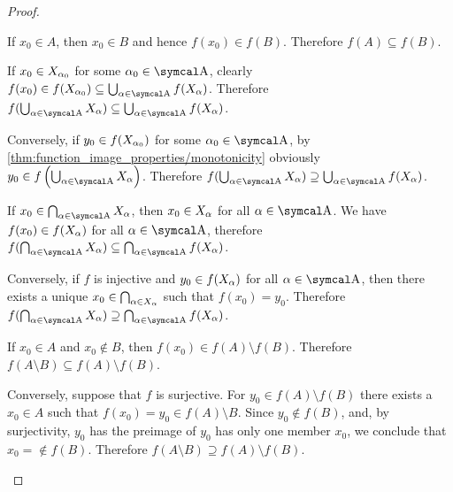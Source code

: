 \begin{proof}\mbox{}
  \begin{propenum}
     If \( x_0 \in A \), then \( x_0 \in B \) and hence \( f(x_0) \in f(B) \). Therefore \( f(A) \subseteq f(B) \).

     If \( x_0 \in X_{\alpha_0} \) for some \( \al_0 \in \CA \), clearly \( f(x_0) \in f(X_{\al_0}) \subseteq \bigcup_{\al \in \CA} f(X_\al) \). Therefore \( f(\bigcup_{\al \in \CA} X_\al) \subseteq \bigcup_{\al \in \CA} f(X_\al) \).

    Conversely, if \( y_0 \in f(X_{\alpha_0}) \) for some \( \al_0 \in \CA \), by \cref{thm:function_image_properties/monotonicity} obviously \( y_0 \in f\left( \bigcup_{\al \in \CA} X_\al \right) \). Therefore \( f(\bigcup_{\al \in \CA} X_\al) \supseteq \bigcup_{\al \in \CA} f(X_\al) \).

     If \( x_0 \in \bigcap_{\al \in \CA} X_{\al} \), then \( x_0 \in X_\alpha \) for all \( \al \in \CA \). We have \( f(x_0) \in f(X_\alpha) \) for all \( \al \in \CA \), therefore \( f(\bigcap_{\al \in \CA} X_\al) \subseteq \bigcap_{\al \in \CA} f(X_\al) \).

    Conversely, if \( f \) is injective and \( y_0 \in f(X_\alpha) \) for all \( \al \in \CA \), then there exists a unique \( x_0 \in \bigcap_{\alpha \in X_\alpha} \) such that \( f(x_0) = y_0 \). Therefore \( f(\bigcap_{\al \in \CA} X_\al) \supseteq \bigcap_{\al \in \CA} f(X_\al) \).

     If \( x_0 \in A \) and \( x_0 \not\in B \), then \( f(x_0) \in f(A) \setminus f(B) \). Therefore \( f(A \setminus B) \subseteq f(A) \setminus f(B) \).

    Conversely, suppose that \( f \) is surjective. For \( y_0 \in f(A) \setminus f(B) \) there exists a \( x_0 \in A \) such that \( f(x_0) = y_0 \in f(A) \setminus B \). Since \( y_0 \not\in f(B) \), and, by surjectivity, \( y_0 \) has the preimage of \( y_0 \) has only one member \( x_0 \), we conclude that \( x_0 = \not\in f(B) \). Therefore \( f(A \setminus B) \supseteq f(A) \setminus f(B) \).
  \end{propenum}
\end{proof}


